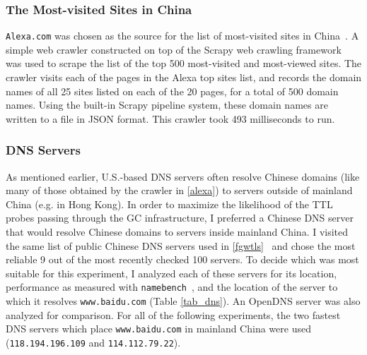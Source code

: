 \subsubsection{The Most-visited Sites in China}\label{alexa}
\texttt{Alexa.com} was chosen as the source for the list of most-visited sites in China~\cite{AlexaCN}.
A simple web crawler constructed on top of the Scrapy web crawling framework~\cite{Scrapy} was used to scrape the list of the top 500 most-visited and most-viewed sites.
The crawler visits each of the pages in the Alexa top sites list, and records the domain names of all 25 sites listed on each of the 20 pages, for a total of 500 domain names.
Using the built-in Scrapy pipeline system, these domain names are written to a file in JSON format.
This crawler took 493 milliseconds to run.
\subsubsection{DNS Servers}\label{dns}
As mentioned earlier, U.S.-based DNS servers often resolve Chinese domains (like many of those obtained by the crawler in \autoref{alexa}) to servers outside of mainland China (e.g. in Hong Kong).
In order to maximize the likelihood of the TTL probes passing through the GC infrastructure, I preferred a Chinese DNS server that would resolve Chinese domains to servers inside mainland China.
I visited the same list of public Chinese DNS servers used in \autoref{fgwtls}~\cite{PublicDNS} and chose the most reliable 9 out of the most recently checked 100 servers.
To decide which was most suitable for this experiment, I analyzed each of these servers for its location, performance as measured with \texttt{namebench}~\cite{Namebench}, and the location of the server to which it resolves \texttt{www.baidu.com} (Table \ref{tab_dns}).
An OpenDNS server was also analyzed for comparison.
For all of the following experiments, the two fastest DNS servers which place \texttt{www.baidu.com} in mainland China were used (\texttt{118.194.196.109} and \texttt{114.112.79.22}).
